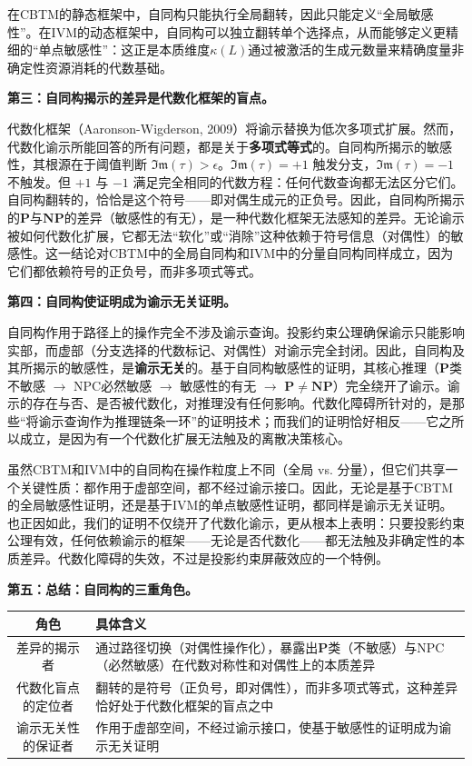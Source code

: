 \documentclass{ctexart}
\begin{document}
	在CBTM的静态框架中，自同构只能执行全局翻转，因此只能定义``全局敏感性''。在IVM的动态框架中，自同构可以独立翻转单个选择点，从而能够定义更精细的``单点敏感性''：这正是本质维度$\kappa(L)$通过被激活的生成元数量来精确度量非确定性资源消耗的代数基础。
	
	\textbf{第三：自同构揭示的差异是代数化框架的盲点。}
	
	代数化框架（Aaronson-Wigderson, 2009）将谕示替换为低次多项式扩展。然而，代数化谕示所能回答的所有问题，都是关于\textbf{多项式等式}的。自同构所揭示的敏感性，其根源在于阈值判断 $\mathfrak{Im}(\tau) > \epsilon$。$\mathfrak{Im}(\tau) = +1$ 触发分支，$\mathfrak{Im}(\tau) = -1$ 不触发。但 $+1$ 与 $-1$ 满足完全相同的代数方程：任何代数查询都无法区分它们。自同构翻转的，恰恰是这个符号——即对偶生成元的正负号。因此，自同构所揭示的$\mathbf{P}$与$\mathbf{NP}$的差异（敏感性的有无），是一种代数化框架无法感知的差异。无论谕示被如何代数化扩展，它都无法``软化''或``消除''这种依赖于符号信息（对偶性）的敏感性。这一结论对CBTM中的全局自同构和IVM中的分量自同构同样成立，因为它们都依赖符号的正负号，而非多项式等式。
	
	\textbf{第四：自同构使证明成为谕示无关证明。}
	
	自同构作用于路径上的操作完全不涉及谕示查询。投影约束公理确保谕示只能影响实部，而虚部（分支选择的代数标记、对偶性）对谕示完全封闭。因此，自同构及其所揭示的敏感性，是\textbf{谕示无关}的。基于自同构敏感性的证明，其核心推理（$\mathbf{P}$类不敏感 $\to$ NPC必然敏感 $\to$ 敏感性的有无 $\to$ $\mathbf{P} \neq \mathbf{NP}$）完全绕开了谕示。谕示的存在与否、是否被代数化，对推理没有任何影响。代数化障碍所针对的，是那些``将谕示查询作为推理链条一环''的证明技术；而我们的证明恰好相反——它之所以成立，是因为有一个代数化扩展无法触及的离散决策核心。
	
	虽然CBTM和IVM中的自同构在操作粒度上不同（全局 vs. 分量），但它们共享一个关键性质：都作用于虚部空间，都不经过谕示接口。因此，无论是基于CBTM的全局敏感性证明，还是基于IVM的单点敏感性证明，都同样是谕示无关证明。	也正因如此，我们的证明不仅绕开了代数化谕示，更从根本上表明：只要投影约束公理有效，任何依赖谕示的框架——无论是否代数化——都无法触及非确定性的本质差异。代数化障碍的失效，不过是投影约束屏蔽效应的一个特例。
	
	\textbf{第五：总结：自同构的三重角色。}
	
	\begin{center}
		\begin{tabular}{c|p{10cm}}
			\hline
			\textbf{角色} & \textbf{具体含义} \\
			\hline
			差异的揭示者 & 通过路径切换（对偶性操作化），暴露出$\mathbf{P}$类（不敏感）与NPC（必然敏感）在代数对称性和对偶性上的本质差异 \\
			代数化盲点的定位者 & 翻转的是符号（正负号，即对偶性），而非多项式等式，这种差异恰好处于代数化框架的盲点之中 \\
			谕示无关性的保证者 & 作用于虚部空间，不经过谕示接口，使基于敏感性的证明成为谕示无关证明 \\
			\hline
		\end{tabular}
	\end{center}
	
\end{document}
